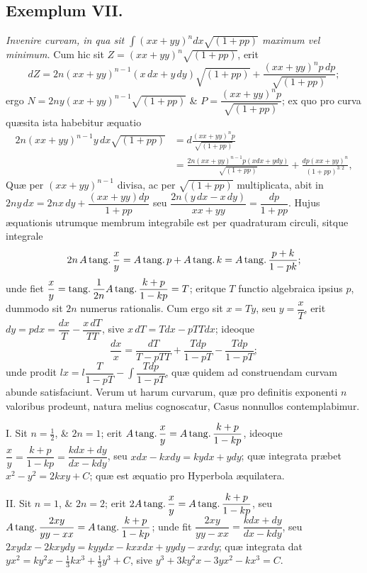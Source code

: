 \subsection*{Exemplum VII.}
\textit{Invenire curvam, in qua sit $\int(xx+yy)^n dx\sqrt{(1+pp)}$ maximum vel minimum.}
Cum hic sit $Z=(xx+yy)^n\sqrt{(1+pp)}$, erit
\[
dZ=2n(xx+yy)^{n-1}(x\,dx+y\,dy)\sqrt{(1+pp)}+\frac{(xx+yy)^n p\,dp}{\sqrt{(1+pp)}};
\]
ergo $N=2ny(xx+yy)^{n-1}\sqrt{(1+pp)}$ \& $P=\dfrac{(xx+yy)^np}{\sqrt{(1+pp)}}$; ex quo pro curva quæsita ista habebitur æquatio
\[
\begin{aligned}
2n(xx+yy)^{n-1}y\,dx\sqrt{(1+pp)}&=d\frac{(xx+yy)^np}{\sqrt{(1+pp)}}\\
&=\frac{2n(xx+yy)^{n-1}p(xdx+ydy)}{\sqrt{(1+pp)}}+\frac{dp(xx+yy)^n}{(1+pp)^{3:2}},
\end{aligned}
\]
Quæ per $(xx+yy)^{n-1}$ divisa, ac per $\sqrt{(1+pp)}$ multiplicata, abit in $2ny\,dx=2nx\,dy+\dfrac{(xx+yy)dp}{1+pp}$ seu $\dfrac{2n(y\,dx-x\,dy)}{xx+yy}=\dfrac{dp}{1+pp}$. Hujus æquationis utrumque membrum integrabile est per quadraturam circuli, sitque integrale
\[
2n\,A\operatorname{tang\textnormal{.}}\frac{x}{y}=A\operatorname{tang\textnormal{.}}p+A\operatorname{tang\textnormal{.}}k=A\operatorname{tang\textnormal{.}}\frac{p+k}{1-pk};
\]
 unde fiet $\dfrac{x}{y}=\operatorname{tang\textnormal{.}}\dfrac1{2n}A\operatorname{tang\textnormal{.}}\dfrac{k+p}{1-kp}=T$; eritque $T$ functio algebraica ipsius $p$, dummodo sit $2n$ numerus rationalis. Cum ergo sit $x=Ty$, seu $y=\dfrac{x}{T}$, erit $dy=pdx=\dfrac{dx}{T}-\dfrac{x\,dT}{TT}$, sive $x\,dT=Tdx-pTTdx$; ideoque
\[
\frac{dx}{x}=\frac{dT}{T-pTT}+\frac{Tdp}{1-pT}-\frac{Tdp}{1-pT};
\]
unde prodit $lx=l\dfrac{T}{1-pT}-\int\dfrac{Tdp}{1-pT}$, quæ quidem ad construendam curvam abunde satisfaciunt. Verum ut harum curvarum, quæ pro definitis exponenti $n$ valoribus prodeunt, natura melius cognoscatur, Casus nonnullos contemplabimur.

I. Sit $n=\frac12$, \& $2n=1$; erit $A\operatorname{tang\textnormal{.}}\dfrac{x}{y}=A\operatorname{tang\textnormal{.}}\dfrac{k+p}{1-kp}$, ideoque $\dfrac{x}{y}=\dfrac{k+p}{1-kp}=\dfrac{kdx+dy}{dx-kdy}$, seu $xdx-kxdy=kydx+ydy$; quæ integrata præbet $x^2-y^2=2kxy+C$; quæ est æquatio pro Hyperbola æquilatera.

II. Sit $n=1$, \& $2n=2$; erit $2A\operatorname{tang\textnormal{.}}\dfrac{x}{y}=A\operatorname{tang\textnormal{.}}\dfrac{k+p}{1-kp}$, seu $A\operatorname{tang\textnormal{.}}\dfrac{2xy}{yy-xx}=A\operatorname{tang\textnormal{.}}\dfrac{k+p}{1-kp}$; unde fit $\dfrac{2xy}{yy-xx}=\dfrac{kdx+dy}{dx-kdy}$, seu $2xydx-2kxydy=kyydx-kxxdx+yydy-xxdy$; quæ integrata dat $yx^2=ky^2x-\frac13kx^3+\frac13y^3+C$, sive $y^3+3ky^2x-3yx^2-kx^3=C$.

